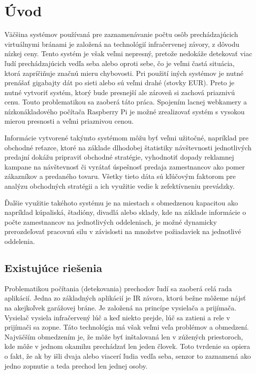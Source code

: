 
\chapter{Úvod}
Väčšina systémov používaná pre zaznamenávanie počtu osôb prechádzajúcich virtuálnymi bránami  je založená na technológií infračervenej závory, z dôvodu nízkej ceny. Tento systém je však veľmi nepresný, pretože nedokáže detekovať viac ľudí prechádzajúcich vedľa seba alebo oproti sebe, čo je veľmi častá situácia, ktorá zapríčiňuje značnú mieru chybovosti. Pri použití iných systémov je nutné prenášať gigabajty dát po sieti alebo sú veľmi drahé (stovky EUR). Preto je nutné vytvoriť systém, ktorý bude presnejší ale zároveň si zachová priaznivú cenu. Touto problematikou sa zaoberá táto práca. Spojením lacnej webkamery a nízkonákladového počítača Raspberry Pi je možné zrealizovať systém s vysokou mierou presnosti a veľmi priaznivou cenou.
    
Informácie vytvorené takýmto systémom môžu byť veľmi užitočné, napríklad pre obchodné reťazce, ktoré na základe dlhodobej štatistiky návštevnosti jednotlivých predajní dokážu pripraviť obchodné stratégie, vyhodnotiť dopady reklamnej kampane na návštevnosť či vyrátať úspešnosť predaja zamestnancov ako pomer zákazníkov a predaného tovaru. Všetky tieto dáta sú kľúčovým faktorom pre analýzu obchodných stratégii a ich využitie vedie k zefektívneniu prevádzky.
    
Ďalšie využitie takéhoto systému je na miestach s obmedzenou kapacitou ako napríklad kúpaliská, štadióny, divadlá alebo sklady, kde na základe informácie o počte zamestnancov na jednotlivých oddeleniach, je možné dynamicky prerozdeľovať pracovnú silu v závislosti na množstve požiadaviek na jednotlivé oddelenia. 



\section{Existujúce riešenia}
Problematikou počítania (detekovania) prechodov ľudí sa zaoberá celá rada aplikácií.  
Jedna zo základných aplikácií je IR závora, ktorú bežne môžeme nájsť na akejkoľvek garážovej bráne. Je založená na princípe vysielača a prijímača. Vysielač vysiela infračervený lúč a keď niekto prejde, lúč sa zatieni a rele v prijímači sa zopne. Táto technológia má však veľmi veľa problémov a obmedzení. Najväčším obmedzením je, že môže byť inštalovaná len v zúžených priestoroch, kde môže v jednom okamihu prechádzať len jeden človek. Toto tvrdenie sa opiera o fakt, že ak by išli dvaja alebo viacerí ľudia vedľa seba, senzor to zaznamená ako jedno zopnutie a teda prechod len jednej osoby.

